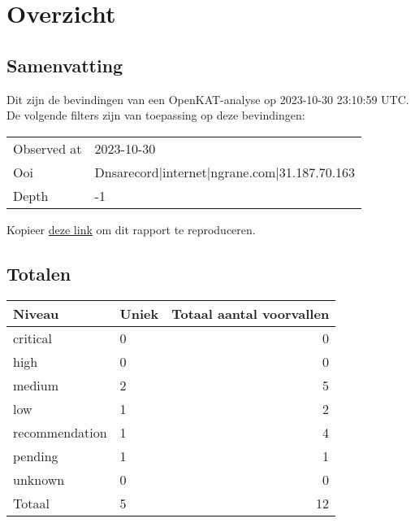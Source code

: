\documentclass[11pt, a4paper]{report}
\begin{document}
\newpage

\chapter{Overzicht}

\section{Samenvatting}
Dit zijn de bevindingen van een OpenKAT-analyse op 2023-10-30 23:10:59 UTC. %
De volgende filters zijn van toepassing op deze bevindingen:

\begin{longtable}{ p{}  p{} }

            Observed at & 2023{-}10{-}30 \\

            Ooi & Dnsarecord|internet|ngrane.com|31.187.70.163 \\

            Depth & {-}1 \\

\end{longtable}



    \noindent Kopieer \href{http://localhost:8000/nl/_steven/objects/report/?observed_at=2023-10-30&depth=-1&ooi_id=DNSARecord%7Cinternet%7Cngrane.com%7C31.187.70.163}{deze link} om dit rapport te reproduceren.



\bgroup{}
\def\arraystretch{1.2}
\section{Totalen}
\begin{tabular}{ llr }
	Niveau & Uniek & Totaal aantal voorvallen \\\toprule
	\toprule

		\colorbox{box-color-critical}{ \color{color-critical} critical } & 0 & 0 \\

		\colorbox{box-color-high}{ \color{color-high} high } & 0 & 0 \\

		\colorbox{box-color-medium}{ \color{color-medium} medium } & 2 & 5 \\

		\colorbox{box-color-low}{ \color{color-low} low } & 1 & 2 \\

		\colorbox{box-color-recommendation}{ \color{color-recommendation} recommendation } & 1 & 4 \\

		\colorbox{box-color-pending}{ \color{color-pending} pending } & 1 & 1 \\

		\colorbox{box-color-unknown}{ \color{color-unknown} unknown } & 0 & 0 \\

	\bottomrule
	Totaal & 5 & 12
\end{tabular}
\egroup{}
\end{document}
